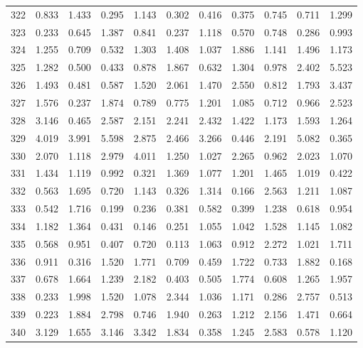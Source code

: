 \begin{tabular}{lrrrrrrrrrr}
322 &  0.833 &  1.433 &  0.295 &  1.143 &  0.302 &  0.416 &  0.375 &  0.745 &  0.711 &  1.299 \\
323 &  0.233 &  0.645 &  1.387 &  0.841 &  0.237 &  1.118 &  0.570 &  0.748 &  0.286 &  0.993 \\
324 &  1.255 &  0.709 &  0.532 &  1.303 &  1.408 &  1.037 &  1.886 &  1.141 &  1.496 &  1.173 \\
325 &  1.282 &  0.500 &  0.433 &  0.878 &  1.867 &  0.632 &  1.304 &  0.978 &  2.402 &  5.523 \\
326 &  1.493 &  0.481 &  0.587 &  1.520 &  2.061 &  1.470 &  2.550 &  0.812 &  1.793 &  3.437 \\
327 &  1.576 &  0.237 &  1.874 &  0.789 &  0.775 &  1.201 &  1.085 &  0.712 &  0.966 &  2.523 \\
328 &  3.146 &  0.465 &  2.587 &  2.151 &  2.241 &  2.432 &  1.422 &  1.173 &  1.593 &  1.264 \\
329 &  4.019 &  3.991 &  5.598 &  2.875 &  2.466 &  3.266 &  0.446 &  2.191 &  5.082 &  0.365 \\
330 &  2.070 &  1.118 &  2.979 &  4.011 &  1.250 &  1.027 &  2.265 &  0.962 &  2.023 &  1.070 \\
331 &  1.434 &  1.119 &  0.992 &  0.321 &  1.369 &  1.077 &  1.201 &  1.465 &  1.019 &  0.422 \\
332 &  0.563 &  1.695 &  0.720 &  1.143 &  0.326 &  1.314 &  0.166 &  2.563 &  1.211 &  1.087 \\
333 &  0.542 &  1.716 &  0.199 &  0.236 &  0.381 &  0.582 &  0.399 &  1.238 &  0.618 &  0.954 \\
334 &  1.182 &  1.364 &  0.431 &  0.146 &  0.251 &  1.055 &  1.042 &  1.528 &  1.145 &  1.082 \\
335 &  0.568 &  0.951 &  0.407 &  0.720 &  0.113 &  1.063 &  0.912 &  2.272 &  1.021 &  1.711 \\
336 &  0.911 &  0.316 &  1.520 &  1.771 &  0.709 &  0.459 &  1.722 &  0.733 &  1.882 &  0.168 \\
337 &  0.678 &  1.664 &  1.239 &  2.182 &  0.403 &  0.505 &  1.774 &  0.608 &  1.265 &  1.957 \\
338 &  0.233 &  1.998 &  1.520 &  1.078 &  2.344 &  1.036 &  1.171 &  0.286 &  2.757 &  0.513 \\
339 &  0.223 &  1.884 &  2.798 &  0.746 &  1.940 &  0.263 &  1.212 &  2.156 &  1.471 &  0.664 \\
340 &  3.129 &  1.655 &  3.146 &  3.342 &  1.834 &  0.358 &  1.245 &  2.583 &  0.578 &  1.120 \\

\end{tabular}
